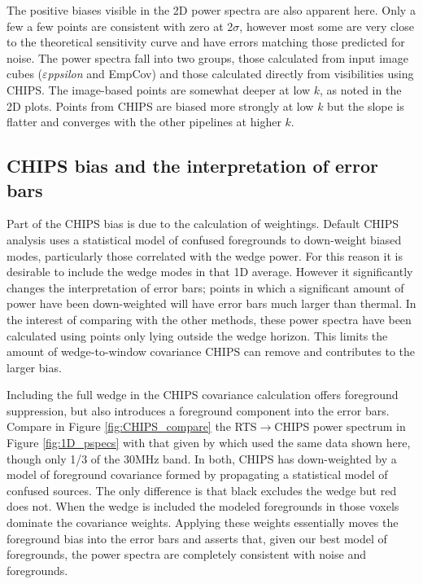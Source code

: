 \documentclass[twolcolumn]{emulateapj}
\def\eppsilon{{\it $\varepsilon$ppsilon}}
\def\empirical{EmpCov}
\def\chipscite{\cite{2016arXiv160102073T}}
\begin{document}
The positive biases visible in the 2D power spectra are also apparent here. Only a few a few points  are consistent with zero at 2$\sigma$, however most some are very close to the theoretical sensitivity curve and have errors matching those predicted for noise.
 The power spectra fall into two groups, those calculated from input image cubes (\eppsilon{} and \empirical{}) and those calculated directly from visibilities using CHIPS. The image-based points are somewhat deeper at low $k$, as noted in the 2D plots.  Points from CHIPS are biased more strongly at low $k$ but the slope is flatter and converges with the other pipelines at higher $k$.  

\subsection{CHIPS bias and the interpretation of error bars}
Part of the CHIPS bias is due to the calculation of weightings. Default CHIPS analysis uses a statistical model of confused foregrounds to down-weight biased modes, particularly those correlated with the wedge power. For this reason it is desirable to include the wedge modes in that 1D average. However it significantly changes the interpretation of error bars; points in which a significant amount of power have been down-weighted will have error bars much larger than thermal. In the interest of comparing with the other methods, these power spectra have been calculated using points only lying outside the wedge horizon. This limits the amount of wedge-to-window covariance CHIPS can remove and contributes to the larger bias. 

Including the full wedge in the CHIPS covariance calculation offers foreground suppression, but also introduces a foreground component into the error bars. Compare in Figure \ref{fig:CHIPS_compare} the RTS$\to$CHIPS power spectrum in Figure \ref{fig:1D_pspecs} with that given by \chipscite{} which used the same data shown here, though only 1/3 of the 30MHz band.  In both, CHIPS has down-weighted by a model of foreground covariance formed by propagating a statistical model of confused sources. The only difference is that black excludes the wedge but red does not. When the wedge is included the modeled foregrounds in those voxels dominate the covariance weights. Applying these weights essentially moves the foreground bias into the error bars and asserts that, given our best model of foregrounds, the power spectra are completely consistent with noise and  foregrounds.
\end{document}
